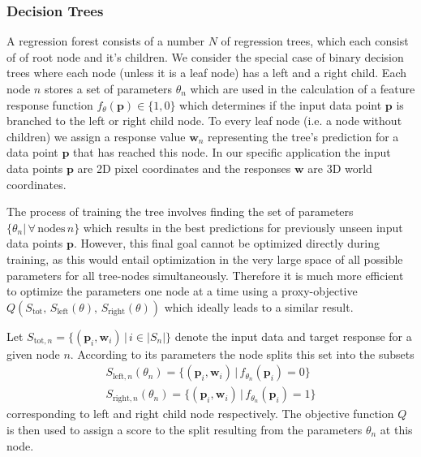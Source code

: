 \documentclass[final]{cvpr}
\begin{document}
\subsubsection{Decision Trees}
A regression forest consists of a number $N$ of regression trees, which each consist of
of root node and it's children. We consider the special case of binary decision trees
where each node (unless it is a leaf node) has a left and a right child. Each node $n$
stores a set of parameters $\theta_n$ which are used in the calculation of a
feature response function $f_{\theta}(\boldsymbol{p}) \in \{1, 0\}$ which determines if the input
data point $\boldsymbol{p}$ is branched to the left or right child node. To every leaf node
(i.e. a node without children) we assign a response value $\boldsymbol{w}_n$ representing
the tree's prediction for a data point $\boldsymbol{p}$ that has reached this node. In our
specific application the input data points $\boldsymbol{p}$ are 2D pixel coordinates and the
responses $\boldsymbol{w}$ are 3D world coordinates.

The process of training the tree involves finding the set of parameters
$\{\theta_n | \, \forall \, \text{nodes} \, n\}$ which results in the best predictions
for previously unseen input data points $\boldsymbol{p}$. However, this final goal cannot
be optimized directly during training, as this would entail optimization in the
very large space of all possible parameters for all tree-nodes simultaneously. Therefore
it is much more efficient to optimize the parameters one node at a time using a
proxy-objective $Q(S_{\text{tot}},\, S_{\text{left}}(\theta),\, S_{\text{right}}(\theta))$
which ideally leads to a similar result.

Let $S_{\text{tot},n} = \{ (\boldsymbol{p}_i, \boldsymbol{w}_i) \, | \, i \in |S_n|\}$ denote the
input data and target response for a given node $n$. According to its parameters the
node splits this set into the subsets
\begin{equation}
\begin{split}
	S_{\text{left},n}(\theta_n) = \{(\boldsymbol{p}_i, \boldsymbol{w}_i) \,|\, f_{\theta_n}(\boldsymbol{p}_i) = 0\} \\
	S_{\text{right},n}(\theta_n) = \{(\boldsymbol{p}_i, \boldsymbol{w}_i) \,|\, f_{\theta_n}(\boldsymbol{p}_i) = 1\}
\end{split}
\end{equation}
corresponding to left and right child node respectively. The objective function $Q$ is
then used to assign a score to the split resulting from the parameters $\theta_n$ at
this node.
\end{document}
